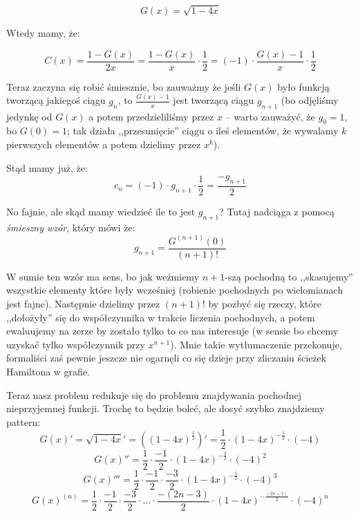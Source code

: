 \begin{equation*}
	G(x) = \sqrt{1 - 4x}
\end{equation*}

Wtedy mamy, że:

\begin{equation*}
	C(x) = \frac{1 - G(x)}{2x} = \frac{1 - G(x)}{x} \cdot \frac{1}{2} = (-1) \cdot \frac{G(x) - 1}{x} \cdot \frac{1}{2}
\end{equation*}

Teraz zaczyna się robić śmiesznie, bo zauważmy że jeśli $G(x)$ było funkcją tworzącą jakiegoś ciągu $g_n$, to $\frac{G(x) - 1}{x}$ jest tworzącą ciągu $g_{n+1}$ (bo odjęliśmy jedynkę od $G(x)$ a potem przedzieliliśmy przez $x$ -- warto zauważyć, że $g_0 = 1$, bo $G(0) = 1$; tak działa ,,przesunięcie'' ciągu o ileś elementów, że wywalamy $k$ pierwszych elementów a potem dzielimy przez $x^k$).

Stąd mamy już, że:
\begin{equation*}
	c_n = (-1) \cdot g_{n+1} \cdot \frac{1}{2} = \frac{-g_{n+1}}{2}
\end{equation*}

No fajnie, ale skąd mamy wiedzieć ile to jest $g_{n+1}$? Tutaj nadciąga z pomocą \textit{śmieszny wzór}, który mówi że:
\begin{equation*}
	g_{n+1} = \frac{G^{(n+1)}(0)}{(n+1)!}
\end{equation*}

W sumie ten wzór ma sens, bo jak weźmiemy $n+1$-szą pochodną to ,,skasujemy'' wszystkie elementy które były wcześniej (robienie pochodnych po wielomianach jest fajne). Następnie dzielimy przez $(n+1)!$ by pozbyć się rzeczy, które ,,dołożyły'' się do współczynnika w trakcie liczenia pochodnych, a potem ewaluujemy na zerze by zostało tylko to co nas interesuje (w sensie bo chcemy uzyskać tylko współczynnik przy $x^{n+1}$). Mnie takie wytłumaczenie przekonuje, formaliści zaś pewnie jeszcze nie ogarnęli co się dzieje przy zliczaniu ścieżek Hamiltona w grafie.

Teraz nasz problem redukuje się do problemu znajdywania pochodnej nieprzyjemnej funkcji. Trochę to będzie boleć, ale dosyć szybko znajdziemy pattern:
\begin{equation*}
	G(x)' = \sqrt{1 - 4x}' = ((1-4x)^{\frac{1}{2}})' = \frac{1}{2} \cdot (1-4x)^{- \frac{1}{2}} \cdot (-4)
\end{equation*}
\begin{equation*}
	G(x)'' = \frac{1}{2} \cdot \frac{-1}{2} \cdot (1-4x)^{- \frac{3}{2}} \cdot (-4)^2
\end{equation*}
\begin{equation*}
	G(x)''' = \frac{1}{2} \cdot \frac{-1}{2} \cdot \frac{-3}{2} \cdot (1-4x)^{- \frac{5}{2}} \cdot (-4)^3
\end{equation*}
\begin{equation*}
	G(x)^{(n)} = \frac{1}{2} \cdot \frac{-1}{2} \cdot \frac{-3}{2} \cdot \dots \cdot \frac{-(2n - 3)}{2} \cdot (1-4x)^{- \frac{(2n-1)}{2}} \cdot (-4)^n
\end{equation*}

